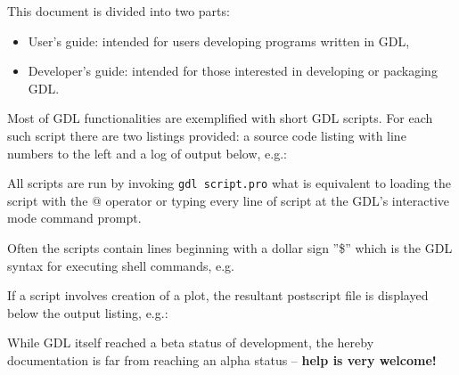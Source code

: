 This document is divided into two parts:
\begin{itemize}
  \item{User's guide: intended for users developing programs written in GDL,}
  \item{Developer's guide: intended for those interested in developing or packaging GDL.}
\end{itemize}

Most of GDL functionalities are exemplified with short GDL scripts.
For each such script there are two listings provided: a source
  code listing with line numbers to the left and a log of output below, e.g.:

All scripts are run by invoking \verb=gdl script.pro= what is equivalent
  to loading the script with the @ operator or typing every line of script
  at the GDL's interactive mode command prompt.

Often the scripts contain lines beginning with a dollar sign ''\$'' which is the GDL
  syntax for executing shell commands, e.g.

If a script involves creation of a plot, the resultant postscript file is
  displayed below the output listing, e.g.:

While GDL itself reached a beta status of development, the hereby documentation
  is far from reaching an alpha status -- {\bf help is very welcome!}
